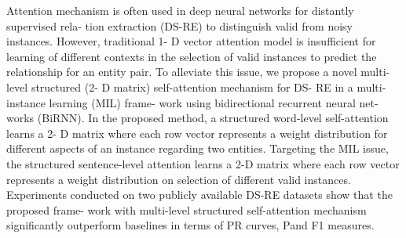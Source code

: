 Attention mechanism is often used in deep neural networks for distantly supervised rela- tion extraction (DS-RE) to distinguish valid from noisy instances. However, traditional 1- D vector attention model is insufficient for learning of different contexts in the selection of valid instances to predict the relationship for an entity pair. To alleviate this issue, we propose a novel multi-level structured (2- D matrix) self-attention mechanism for DS- RE in a multi-instance learning (MIL) frame- work using bidirectional recurrent neural net- works (BiRNN). In the proposed method, a structured word-level self-attention learns a 2- D matrix where each row vector represents a weight distribution for different aspects of an instance regarding two entities. Targeting the MIL issue, the structured sentence-level attention learns a 2-D matrix where each row vector represents a weight distribution on selection of different valid instances. Experiments conducted on two publicly available DS-RE datasets show that the proposed frame- work with multi-level structured self-attention mechanism significantly outperform baselines in terms of PR curves, P\@N and F1 measures.
